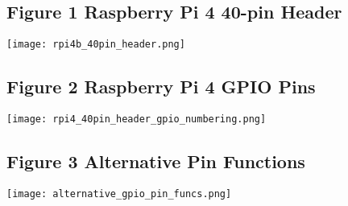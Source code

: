 \documentclass[journal]{IEEEtran}
\begin{document}
      \subsection{Figure 1 Raspberry Pi 4 40-pin Header}

      \texttt{[image: rpi4b\_40pin\_header.png]}

      \subsection{Figure 2 Raspberry Pi 4 GPIO Pins}

      \texttt{[image: rpi4\_40pin\_header\_gpio\_numbering.png]}

      \subsection{Figure 3 Alternative Pin Functions}

      \texttt{[image: alternative\_gpio\_pin\_funcs.png]}
    
\end{document}
